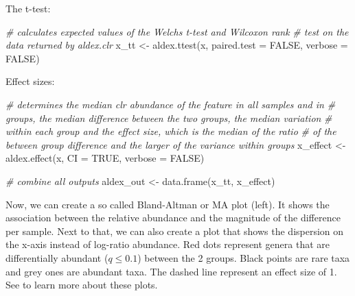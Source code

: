 \documentclass[
]{book}
\newenvironment{Shaded}{\begin{snugshade}}{\end{snugshade}}
\newcommand{\AttributeTok}[1]{\textcolor[rgb]{0.77,0.63,0.00}{#1}}
\newcommand{\CommentTok}[1]{\textcolor[rgb]{0.56,0.35,0.01}{\textit{#1}}}
\newcommand{\ConstantTok}[1]{\textcolor[rgb]{0.00,0.00,0.00}{#1}}
\newcommand{\FunctionTok}[1]{\textcolor[rgb]{0.00,0.00,0.00}{#1}}
\newcommand{\NormalTok}[1]{#1}
\newcommand{\OtherTok}[1]{\textcolor[rgb]{0.56,0.35,0.01}{#1}}
\begin{document}
The t-test:

\begin{Shaded}
\begin{Highlighting}[]
\CommentTok{\# calculates expected values of the Welch\textquotesingle{}s t{-}test and Wilcoxon rank}
\CommentTok{\# test on the data returned by aldex.clr}
\NormalTok{x\_tt }\OtherTok{\textless{}{-}} \FunctionTok{aldex.ttest}\NormalTok{(x, }\AttributeTok{paired.test =} \ConstantTok{FALSE}\NormalTok{, }\AttributeTok{verbose =} \ConstantTok{FALSE}\NormalTok{)}
\end{Highlighting}
\end{Shaded}

Effect sizes:

\begin{Shaded}
\begin{Highlighting}[]
\CommentTok{\# determines the median clr abundance of the feature in all samples and in}
\CommentTok{\# groups, the median difference between the two groups, the median variation}
\CommentTok{\# within each group and the effect size, which is the median of the ratio}
\CommentTok{\# of the between group difference and the larger of the variance within groups}
\NormalTok{x\_effect }\OtherTok{\textless{}{-}} \FunctionTok{aldex.effect}\NormalTok{(x, }\AttributeTok{CI =} \ConstantTok{TRUE}\NormalTok{, }\AttributeTok{verbose =} \ConstantTok{FALSE}\NormalTok{)}

\CommentTok{\# combine all outputs }
\NormalTok{aldex\_out }\OtherTok{\textless{}{-}} \FunctionTok{data.frame}\NormalTok{(x\_tt, x\_effect)}
\end{Highlighting}
\end{Shaded}

Now, we can create a so called Bland-Altman or MA plot (left). It shows the
association between the relative abundance and the magnitude of the difference
per sample. Next to that, we can also create a plot that shows the dispersion
on the x-axis instead of log-ratio abundance. Red dots represent genera that are
differentially abundant (\(q \leq 0.1\)) between the 2 groups. Black points are
rare taxa and grey ones are abundant taxa. The dashed line represent an effect
size of 1. See \citet{Gloor2016} to learn more about these plots.
\end{document}
